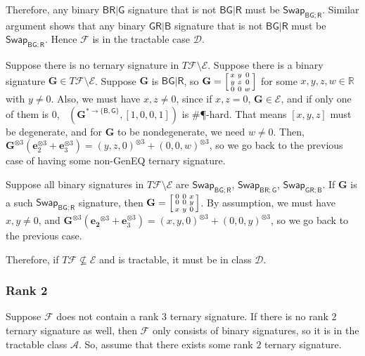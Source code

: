 \documentclass[11pt]{article}
\DeclareMathOperator{\holbs}{Holant^*_2}
\newcommand{\db}{\mathsf{B}}
\newcommand{\dg}{\mathsf{G}}
\newcommand{\dr}{\mathsf{R}}
\newcommand{\geneq}{\textsf{GenEQ}\xspace}
\newcommand{\swhelper}[1]{$\mathsf{Swap}_{#1}$\xspace}
\newcommand{\swbg}{\swhelper{\db \dg; \dr}}
\newcommand{\swbr}{\swhelper{\db \dr; \dg}}
\newcommand{\swgr}{\swhelper{\dg \dr; \db}}
\newcommand{\sph}{\#\P-hard\xspace}
\newcommand{\teh}{^{\otimes 3}}
\newcommand{\domres}[1]{
  ^{*\to\{#1\}}
}
\newcommand{\bdgr}{\dg \dr | \db}
\newcommand{\tractbinary}{$\mathscr{A}$\xspace}
\newcommand{\tractBGR}{$\mathscr{D}$\xspace}
\begin{document}
Therefore, any binary $\db \dr | \dg$ signature that is not $\db \dg | \dr$ must be \swbg.
Similar argument shows that any binary $\bdgr$ signature that is not $\db \dg | \dr$ must be \swbg.
Hence $\mathcal{F}$ is in the tractable case \tractBGR.

Suppose there is no ternary signature in $T \mathcal{F} \setminus \mathcal{E}$.
Suppose there is a binary signature $\mathbf{G} \in T \mathcal{F} \setminus \mathcal{E}$.
Suppose $\mathbf{G}$ is $\db \dg | \dr$, so $\mathbf{G} = \begin{bsmallmatrix}
  x & y & 0 \\
  y & z & 0 \\
  0 & 0 & w
\end{bsmallmatrix}$ for some $x, y, z, w \in \mathbb{R}$ with $y \ne 0$.
Also, we must have $x, z \ne 0$, since if $x, z = 0$, $\mathbf{G} \in \mathcal{E}$, and if only one of them is $0$, $\holbs(\mathbf{G}\domres{\db, \dg}, [1, 0, 0, 1])$ is \sph.
That means $[x, y, z]$ must be degenerate, and for $\mathbf{G}$ to be nondegenerate, we need $w \ne 0$.
Then, $\mathbf{G}\teh(\mathbf{e}_2\teh + \mathbf{e}_3\teh) = (y, z, 0)\teh + (0, 0, w)\teh$, so we go back to the previous case of having some non-\geneq ternary signature.

Suppose all binary signatures in $T \mathcal{F} \setminus \mathcal{E}$ are \swbg, \swbr, \swgr.
If $\mathbf{G}$ is a such \swbg signature, then $\mathbf{G} = \begin{bsmallmatrix}
  0 & 0 & x \\
  0 & 0 & y \\
  x & y & 0
\end{bsmallmatrix}$.
By assumption, we must have $x, y \ne 0$, and $\mathbf{G}\teh (\mathbf{e_2}\teh + \mathbf{e}_3\teh) = (x, y, 0)\teh + (0, 0, y)\teh$, so we go back to the previous case.

Therefore, if $T \mathcal{F} \not \subseteq \mathcal{E}$ and is tractable, it must be in class \tractBGR.

\subsubsection{Rank 2} \label{subsec:contains-rank-2}
Suppose $\mathcal{F}$ does not contain a rank $3$ ternary signature. 
If there is no rank $2$ ternary signature as well, then $\mathcal{F}$ only consists of binary signatures, so it is in the tractable class \tractbinary.
So, assume that there exists some rank $2$ ternary signature.
\end{document}
